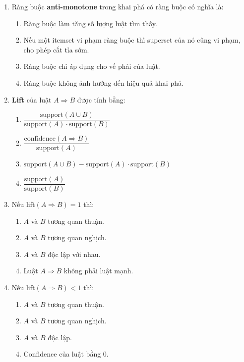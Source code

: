 \documentclass[10pt]{article}
\begin{document}
\begin{enumerate}[leftmargin=*, label=\textbf{Câu \arabic*.}]
    \item Ràng buộc \textbf{anti-monotone} trong khai phá có ràng buộc có nghĩa là:
    \begin{enumerate}[label=\Alph*.]
        \item Ràng buộc làm tăng số lượng luật tìm thấy.
        \item Nếu một itemset vi phạm ràng buộc thì superset của nó cũng vi phạm, cho phép cắt tỉa sớm.
        \item Ràng buộc chỉ áp dụng cho vế phải của luật.
        \item Ràng buộc không ảnh hưởng đến hiệu quả khai phá.
    \end{enumerate}

    \item \textbf{Lift} của luật $A \Rightarrow B$ được tính bằng:
    \begin{enumerate}[label=\Alph*.]
        \item $\dfrac{\text{support}(A \cup B)}{\text{support}(A) \cdot \text{support}(B)}$
        \item $\dfrac{\text{confidence}(A \Rightarrow B)}{\text{support}(A)}$
        \item $\text{support}(A \cup B) - \text{support}(A) \cdot \text{support}(B)$
        \item $\dfrac{\text{support}(A)}{\text{support}(B)}$
    \end{enumerate}

    \item Nếu lift$(A \Rightarrow B) = 1$ thì:
    \begin{enumerate}[label=\Alph*.]
        \item $A$ và $B$ tương quan thuận.
        \item $A$ và $B$ tương quan nghịch.
        \item $A$ và $B$ độc lập với nhau.
        \item Luật $A \Rightarrow B$ không phải luật mạnh.
    \end{enumerate}

    \item Nếu lift$(A \Rightarrow B) < 1$ thì:
    \begin{enumerate}[label=\Alph*.]
        \item $A$ và $B$ tương quan thuận.
        \item $A$ và $B$ tương quan nghịch.
        \item $A$ và $B$ độc lập.
        \item Confidence của luật bằng 0.
    \end{enumerate}


\end{enumerate}
\end{document}

